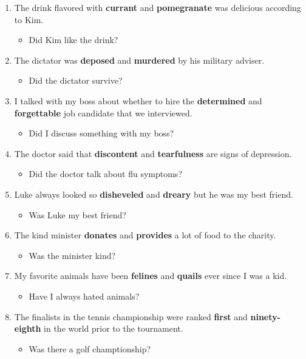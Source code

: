 \documentclass[authoryear]{elsarticle}
\begin{document}
\begin{enumerate}
\item The drink flavored with \textbf{currant} and \textbf{pomegranate} was delicious according to Kim.	\begin{itemize} \item Did Kim like the drink?\end{itemize}
\item The dictator was \textbf{deposed} and \textbf{murdered} by his military adviser.	\begin{itemize} \item Did the dictator survive?\end{itemize}
\item I talked with my boss about whether to hire the \textbf{determined} and \textbf{forgettable} job candidate that we interviewed.	\begin{itemize} \item Did I discuss something with my boss?\end{itemize}
\item The doctor said that \textbf{discontent} and \textbf{tearfulness} are signs of depression.	\begin{itemize} \item Did the doctor talk about flu symptoms?\end{itemize}
\item Luke always looked so \textbf{disheveled} and \textbf{dreary} but he was my best friend.	\begin{itemize} \item Was Luke my best friend?\end{itemize}
\item The kind minister \textbf{donates} and \textbf{provides} a lot of food to the charity.	\begin{itemize} \item Was the minister kind?\end{itemize}
\item My favorite animals have been \textbf{felines} and \textbf{quails} ever since I was a kid.	\begin{itemize} \item Have I always hated animals?\end{itemize}
\item The finalists in the tennis championship were ranked \textbf{first} and \textbf{ninety-eighth} in the world prior to the tournament.	\begin{itemize} \item Was there a golf champtionship?\end{itemize}

\end{enumerate}
\end{document}
